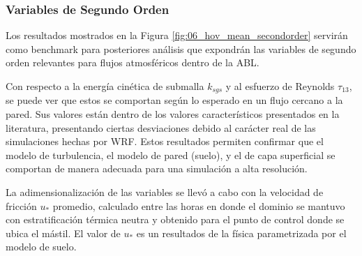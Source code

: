 \subsubsection{Variables de Segundo Orden}
Los resultados mostrados en la Figura \ref{fig:06_hov_mean_secondorder} servirán como benchmark para posteriores análisis que expondrán las variables de segundo orden relevantes para flujos atmosféricos dentro de la ABL. 

Con respecto a la energía cinética de submalla $k_{sgs}$ y al esfuerzo de Reynolds $\tau_{13}$, se puede ver que estos se comportan según lo esperado en un flujo cercano a la pared. Sus valores están dentro de los valores característicos presentados en la literatura, presentando ciertas desviaciones debido al carácter real de las simulaciones hechas por WRF. Estos resultados permiten confirmar que el modelo de turbulencia, el modelo de pared (suelo), y el de capa superficial se comportan de manera adecuada para una simulación a alta resolución.

La adimensionalización de las variables se llevó a cabo con la velocidad de fricción $u_*$ promedio, calculado entre las horas en donde el dominio se mantuvo con estratificación térmica neutra y obtenido para el punto de control donde se ubica el mástil. El valor de $u_*$ es un resultados de la física parametrizada por el modelo de suelo.

